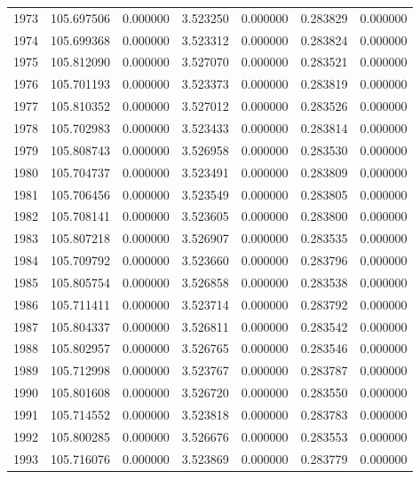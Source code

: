 \begin{tabular}{rrrrrrr}
1973 & 105.697506 &    0.000000 &  3.523250 &    0.000000 &    0.283829 &  0.000000 \\
1974 & 105.699368 &    0.000000 &  3.523312 &    0.000000 &    0.283824 &  0.000000 \\
1975 & 105.812090 &    0.000000 &  3.527070 &    0.000000 &    0.283521 &  0.000000 \\
1976 & 105.701193 &    0.000000 &  3.523373 &    0.000000 &    0.283819 &  0.000000 \\
1977 & 105.810352 &    0.000000 &  3.527012 &    0.000000 &    0.283526 &  0.000000 \\
1978 & 105.702983 &    0.000000 &  3.523433 &    0.000000 &    0.283814 &  0.000000 \\
1979 & 105.808743 &    0.000000 &  3.526958 &    0.000000 &    0.283530 &  0.000000 \\
1980 & 105.704737 &    0.000000 &  3.523491 &    0.000000 &    0.283809 &  0.000000 \\
1981 & 105.706456 &    0.000000 &  3.523549 &    0.000000 &    0.283805 &  0.000000 \\
1982 & 105.708141 &    0.000000 &  3.523605 &    0.000000 &    0.283800 &  0.000000 \\
1983 & 105.807218 &    0.000000 &  3.526907 &    0.000000 &    0.283535 &  0.000000 \\
1984 & 105.709792 &    0.000000 &  3.523660 &    0.000000 &    0.283796 &  0.000000 \\
1985 & 105.805754 &    0.000000 &  3.526858 &    0.000000 &    0.283538 &  0.000000 \\
1986 & 105.711411 &    0.000000 &  3.523714 &    0.000000 &    0.283792 &  0.000000 \\
1987 & 105.804337 &    0.000000 &  3.526811 &    0.000000 &    0.283542 &  0.000000 \\
1988 & 105.802957 &    0.000000 &  3.526765 &    0.000000 &    0.283546 &  0.000000 \\
1989 & 105.712998 &    0.000000 &  3.523767 &    0.000000 &    0.283787 &  0.000000 \\
1990 & 105.801608 &    0.000000 &  3.526720 &    0.000000 &    0.283550 &  0.000000 \\
1991 & 105.714552 &    0.000000 &  3.523818 &    0.000000 &    0.283783 &  0.000000 \\
1992 & 105.800285 &    0.000000 &  3.526676 &    0.000000 &    0.283553 &  0.000000 \\
1993 & 105.716076 &    0.000000 &  3.523869 &    0.000000 &    0.283779 &  0.000000 \\

\end{tabular}
